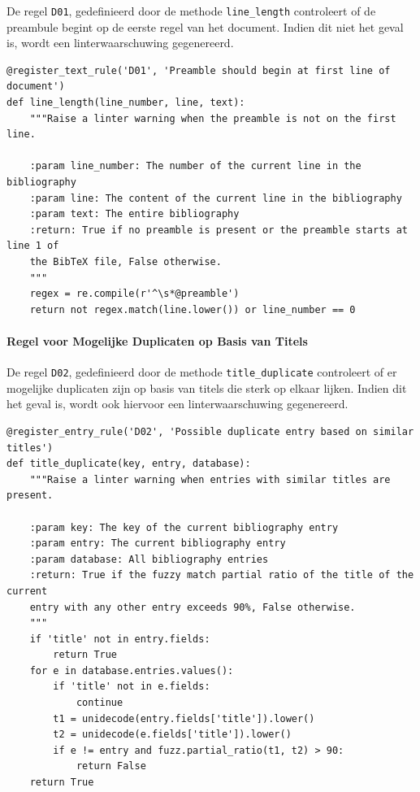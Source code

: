 De regel \texttt{D01}, gedefinieerd door de methode \texttt{line\_length} controleert of de preambule begint op de eerste regel van het document. Indien dit niet het geval is, wordt een linterwaarschuwing gegenereerd.

\begin{verbatim}
@register_text_rule('D01', 'Preamble should begin at first line of document')
def line_length(line_number, line, text):
    """Raise a linter warning when the preamble is not on the first line.

    :param line_number: The number of the current line in the bibliography
    :param line: The content of the current line in the bibliography
    :param text: The entire bibliography
    :return: True if no preamble is present or the preamble starts at line 1 of
    the BibTeX file, False otherwise.
    """
    regex = re.compile(r'^\s*@preamble')
    return not regex.match(line.lower()) or line_number == 0
\end{verbatim}

\paragraph{Regel voor Mogelijke Duplicaten op Basis van Titels}

De regel \texttt{D02}, gedefinieerd door de methode \texttt{title\_duplicate} controleert of er mogelijke duplicaten zijn op basis van titels die sterk op elkaar lijken. Indien dit het geval is, wordt ook hiervoor een linterwaarschuwing gegenereerd.

\begin{verbatim}
@register_entry_rule('D02', 'Possible duplicate entry based on similar titles')
def title_duplicate(key, entry, database):
    """Raise a linter warning when entries with similar titles are present.

    :param key: The key of the current bibliography entry
    :param entry: The current bibliography entry
    :param database: All bibliography entries
    :return: True if the fuzzy match partial ratio of the title of the current
    entry with any other entry exceeds 90%, False otherwise.
    """
    if 'title' not in entry.fields:
        return True
    for e in database.entries.values():
        if 'title' not in e.fields:
            continue
        t1 = unidecode(entry.fields['title']).lower()
        t2 = unidecode(e.fields['title']).lower()
        if e != entry and fuzz.partial_ratio(t1, t2) > 90:
            return False
    return True
\end{verbatim}

